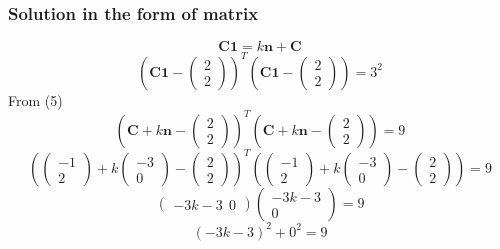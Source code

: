 \documentclass{beamer}
\begin{document}
\begin{frame}
\frametitle{Solution in the form of matrix}
\begin{equation}\textbf{C1} = k\textbf{n} + \textbf{C} \end{equation}
$$(\textbf{C1}-\begin{pmatrix}2\\ 2 \end{pmatrix})^T(\textbf{C1}-\begin{pmatrix}2\\ 2 \end{pmatrix}) = 3^2 $$
From (5) $$ ( \textbf{C} + k\textbf{n} - \begin{pmatrix}2\\ 2 \end{pmatrix})^T( \textbf{C} + k\textbf{n} - \begin{pmatrix}2\\ 2 \end{pmatrix}) = 9 $$
$$( \begin{pmatrix}-1\\ 2 \end{pmatrix} + k \begin{pmatrix}-3\\ 0 \end{pmatrix} - \begin{pmatrix}2\\ 2 \end{pmatrix})^T(\begin{pmatrix}-1\\ 2 \end{pmatrix} + k \begin{pmatrix}-3\\ 0 \end{pmatrix} - \begin{pmatrix}2\\ 2 \end{pmatrix}) = 9 $$
$$ \begin{pmatrix}-3k - 3 \ \ 0 \end{pmatrix} \begin{pmatrix}-3k - 3 \\ 0 \end{pmatrix} = 9 $$
$$ ( -3k - 3 )^ 2 + 0^2 = 9 $$
\end{frame}
\end{document}
